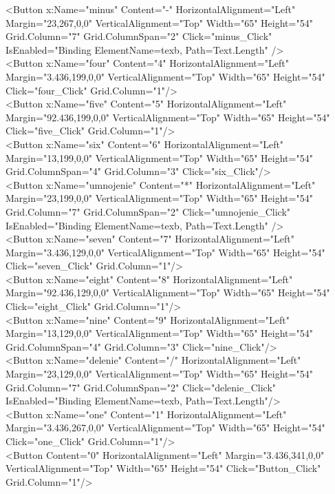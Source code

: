         <Button x:Name="minus" Content="-" HorizontalAlignment="Left" Margin="23,267,0,0" VerticalAlignment="Top" Width="65" Height="54" Grid.Column="7" Grid.ColumnSpan="2" Click="minus\_Click" IsEnabled="{Binding ElementName=texb, Path=Text.Length}" />\\
        <Button x:Name="four" Content="4" HorizontalAlignment="Left" Margin="3.436,199,0,0" VerticalAlignment="Top" Width="65" Height="54" Click="four\_Click" Grid.Column="1"/>\\
        <Button x:Name="five" Content="5" HorizontalAlignment="Left" Margin="92.436,199,0,0" VerticalAlignment="Top" Width="65" Height="54" Click="five\_Click" Grid.Column="1"/>\\
        <Button x:Name="six" Content="6" HorizontalAlignment="Left" Margin="13,199,0,0" VerticalAlignment="Top" Width="65" Height="54" Grid.ColumnSpan="4" Grid.Column="3" Click="six\_Click"/>\\
        <Button x:Name="umnojenie" Content="*" HorizontalAlignment="Left" Margin="23,199,0,0" VerticalAlignment="Top" Width="65" Height="54" Grid.Column="7" Grid.ColumnSpan="2" Click="umnojenie\_Click" IsEnabled="{Binding ElementName=texb, Path=Text.Length}" />\\
        <Button x:Name="seven" Content="7" HorizontalAlignment="Left" Margin="3.436,129,0,0" VerticalAlignment="Top" Width="65" Height="54" Click="seven\_Click" Grid.Column="1"/>\\
        <Button x:Name="eight" Content="8" HorizontalAlignment="Left" Margin="92.436,129,0,0" VerticalAlignment="Top" Width="65" Height="54" Click="eight\_Click" Grid.Column="1"/>\\
        <Button x:Name="nine" Content="9" HorizontalAlignment="Left" Margin="13,129,0,0" VerticalAlignment="Top" Width="65" Height="54" Grid.ColumnSpan="4" Grid.Column="3" Click="nine\_Click"/>\\
        <Button x:Name="delenie" Content="/" HorizontalAlignment="Left" Margin="23,129,0,0" VerticalAlignment="Top" Width="65" Height="54" Grid.Column="7" Grid.ColumnSpan="2" Click="delenie\_Click" IsEnabled="{Binding ElementName=texb, Path=Text.Length}"/>\\
        <Button x:Name="one" Content="1" HorizontalAlignment="Left" Margin="3.436,267,0,0" VerticalAlignment="Top" Width="65" Height="54" Click="one\_Click" Grid.Column="1"/>\\
        <Button Content="0" HorizontalAlignment="Left" Margin="3.436,341,0,0" VerticalAlignment="Top" Width="65" Height="54" Click="Button\_Click" Grid.Column="1"/>\\
